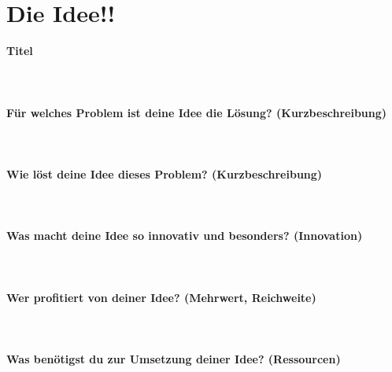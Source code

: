\section*{Die Idee!!}

\begin{Form}
   	
  	\textbf{Titel} \\ 
  	\TextField[name=ideeTitel, width=0.9\textwidth]{}
  	\\ \\ \\
  	\textbf{Für welches Problem ist deine Idee die Lösung? (Kurzbeschreibung)} 
  	\\ 
  	\TextField[multiline, name=background,width=0.9\textwidth,  height=2cm, value={} ]{}
  	\\ \\ \\
  	 \textbf{Wie löst deine Idee dieses Problem? (Kurzbeschreibung)} 
  	 \\ 
  	\TextField[multiline, name=goal,width=0.9\textwidth,  height=2cm, value={}]{}
  	\\ \\ \\
  	 \textbf{Was macht deine Idee so innovativ und besonders? (Innovation)}
  	 \\ 
  	\TextField[multiline, name=value,width=0.9\textwidth,  height=2cm, value={} ]{}
  	\\ \\ \\
  	 \textbf{Wer profitiert von deiner Idee? (Mehrwert, Reichweite)} 
  	 \\ 
  	\TextField[multiline, name=must,width=0.9\textwidth,  height=2cm, value={}]{}
     \\ \\ \\
  	 \textbf{Was benötigst du zur Umsetzung deiner Idee? (Ressourcen)} 
  	 \\ 
  	\TextField[multiline, name=priority,width=0.9\textwidth,  height=2cm, value={} ]{}
\end{Form}